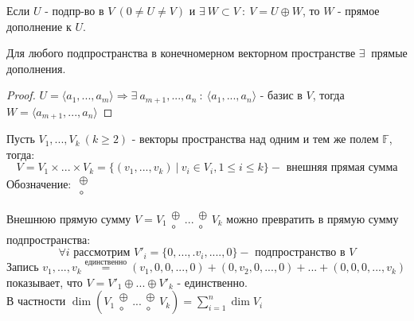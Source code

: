     \begin{definition}
        Если $U$ - подпр-во в $V \ (0 \neq U \neq V)$ и $\exists \ W \subset V \ : \ V = U \oplus W$, то $W$ - прямое дополнение к $U$.    
    \end{definition}
    \begin{consequense}
        Для любого подпространства в конечномерном векторном пространстве $\exists \ $ прямые дополнения. 
    \end{consequense} 
    \begin{proof}
        $U = \langle a_1,...,a_m \rangle \Longrightarrow \exists \ a_{m+1},...,a_n \ : \ \langle a_1,...,a_n \rangle$ - базис в $V$, тогда $W = \langle a_{m+1},...,a_n \rangle$   
    \end{proof}
    \begin{definition}
        Пусть $V_1,...,V_k \ (k\geq 2)$ - векторы пространства над одним и тем же полем $\mathbb{F}$, тогда: 
        $$V = V_1 \times ... \times V_k = \{ (v_1,...,v_k) \ | \ v_i \in V_i, 1\leq i \leq k\} - \text{ внешняя прямая сумма}$$ 
        Обозначение: $\begin{smallmatrix}
        \oplus \\ \circ 
    \end{smallmatrix}$
    \end{definition} 
    \begin{remark}
        Внешнюю прямую сумму $V = V_1 \begin{smallmatrix}
            \oplus \\ \circ
        \end{smallmatrix} ... \begin{smallmatrix}
            \oplus \\ \circ
        \end{smallmatrix} V_k$  можно превратить в прямую сумму подпространства:
        $$\forall i \text{ рассмотрим } V'_i = \{0,...,.v_i,....,0\} - \text{ подпространство в } V$$
        Запись $v_1,...,v_k \overset{\text{единственно}}{=} (v_1,0,0,...,0) + (0,v_2,0,...,0)+...+(0,0,0,...,v_k)$ показывает, что $V = V'_1 \oplus ... \oplus V'_k$ - единственно. \\
        В частности $\dim (V_1 \begin{smallmatrix}
            \oplus \\ \circ 
        \end{smallmatrix} ... \begin{smallmatrix}
            \oplus \\ \circ 
        \end{smallmatrix} V_k ) = \sum \limits_{i=1}^n \dim V_i$ 
    \end{remark} 
